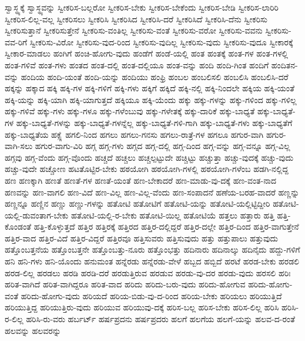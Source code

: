 {ಸ್ವಾಸ್ಥ್ಯಕ್ಕೆ
ಸ್ವಾಸ್ಥ್ಯವನ್ನು
ಸ್ವೀಕರಿಸ-ಬಲ್ಲರೋ
ಸ್ವೀಕರಿಸ-ಬೇಕು
ಸ್ವೀಕರಿಸ-ಬೇಕೆಂದು
ಸ್ವೀಕರಿಸ-ಬೇಡಿ
ಸ್ವೀಕರಿಸ-ಲಾರಿರಿ
ಸ್ವೀಕರಿಸ-ಲಿಲ್ಲ-ವಲ್ಲ
ಸ್ವೀಕರಿಸಲು
ಸ್ವೀಕರಿಸಿ
ಸ್ವೀಕರಿಸಿದ
ಸ್ವೀಕರಿಸಿ-ದರೆ
ಸ್ವೀಕರಿಸಿದೆ
ಸ್ವೀಕರಿಸಿ-ದೆನು
ಸ್ವೀಕರಿಸು
ಸ್ವೀಕರಿಸುತ್ತಾನೆ
ಸ್ವೀಕರಿಸುತ್ತೇನೆ
ಸ್ವೀಕರಿಸು-ವಂತಿಲ್ಲ
ಸ್ವೀಕರಿಸು-ವಂತೆ
ಸ್ವೀಕರಿಸು-ವರೋ
ಸ್ವೀಕರಿಸು-ವವನು
ಸ್ವೀಕರಿಸು-ವವ-ರಿಗೆ
ಸ್ವೀಕರಿಸು-ವಿರೋ
ಸ್ವೀಕರಿಸು-ವುದ-ರಿಂದ
ಸ್ವೀಕರಿಸು-ವುದಿಲ್ಲ
ಸ್ವೀಕರಿಸು-ವುದು
ಸ್ವೀಕರಿಸು-ವುದೂ
ಸ್ವೀಕಾರಕ್ಕೆ
ಸ್ವೀಕಾರ-ಮಾಡಲು
ಹಂಗಿಗೆ
ಹಂಚಿ-ಹೋಗು-ವುದು
ಹಂಡೆಗೆ
ಹಂಡೆ-ಯಲ್ಲಿ
ಹಂತ
ಹಂತಕ್ಕೆ
ಹಂತ-ಗಳ
ಹಂತ-ಗಳಲ್ಲಿ
ಹಂತ-ಗಳಿವೆ
ಹಂತ-ಗಳು
ಹಂತದ
ಹಂತ-ದಲ್ಲಿ
ಹಂತ-ದಲ್ಲಿಯೂ
ಹಂತ-ವನ್ನು
ಹಂದಿ
ಹಂದಿ-ಗಿಂತ
ಹಂದಿಗೆ
ಹಂದಿತನ-ವನ್ನು
ಹಂದಿಯ
ಹಂದಿ-ಯಂತೆ
ಹಂದಿ-ಯನ್ನು
ಹಂದಿಯು
ಹಂಫ್ರಿ
ಹಂಬಲ
ಹಂಬಲಿಸಲಿ
ಹಂಬಲಿಸಿ
ಹಂಬಲಿಸಿ-ದರೆ
ಹಕ್ಕನ್ನು
ಹಕ್ಕಾದ
ಹಕ್ಕಿ
ಹಕ್ಕಿ-ಗಳ
ಹಕ್ಕಿ-ಗಳಿಗೆ
ಹಕ್ಕಿ-ಗಳು
ಹಕ್ಕಿಗೆ
ಹಕ್ಕಿದೆ
ಹಕ್ಕಿ-ನಲ್ಲಿ
ಹಕ್ಕಿ-ನಿಂದಲೇ
ಹಕ್ಕಿಯ
ಹಕ್ಕಿ-ಯಂತೆ
ಹಕ್ಕಿ-ಯನ್ನು
ಹಕ್ಕಿ-ಯಾಗಿ
ಹಕ್ಕಿ-ಯಾಗುತ್ತದೆ
ಹಕ್ಕಿಯೂ
ಹಕ್ಕಿ-ಯೆಂದು
ಹಕ್ಕು
ಹಕ್ಕು-ಗಳನ್ನು
ಹಕ್ಕು-ಗಳಿಂದ
ಹಕ್ಕು-ಗಳಿಲ್ಲ
ಹಕ್ಕು-ಗಳಿವೆ
ಹಕ್ಕು-ಗಳು
ಹಕ್ಕು-ಗಳೂ
ಹಕ್ಕು-ಗಳೆಂಬುವು
ಹಕ್ಕು-ಗಳೇತಕ್ಕೆ
ಹಕ್ಕು-ದಾರಿಕೆ
ಹಕ್ಕು-ಬಾಧ್ಯತೆ
ಹಕ್ಕು-ಬಾಧ್ಯತೆ-ಗಳ
ಹಕ್ಕು-ಬಾಧ್ಯತೆ-ಗಳನ್ನು
ಹಕ್ಕು-ಬಾಧ್ಯತೆ-ಗಳನ್ನೆಲ್ಲ
ಹಕ್ಕು-ಬಾಧ್ಯತೆ-ಗಳಿ-ಗಾಗಿ
ಹಕ್ಕು-ಬಾಧ್ಯತೆ-ಗಳು
ಹಕ್ಕು-ಬಾಧ್ಯತೆಗೆ
ಹಕ್ಕು-ಬಾಧ್ಯತೆಯ
ಹಕ್ಸ್ಲೆ
ಹಗಲಿ-ನಿಂದ
ಹಗಲು
ಹಗಲು-ಗನಸು
ಹಗಲು-ರಾತ್ರೆ-ಗಳ
ಹಗಲೂ
ಹಗುರ-ವಾಗಿ
ಹಗುರ-ವಾಗಿ-ಸಲು
ಹಗುರ-ವಾಗು-ವಿರಿ
ಹಗ್ಗ
ಹಗ್ಗ-ಗಳು
ಹಗ್ಗದ
ಹಗ್ಗ-ದಲ್ಲಿ
ಹಗ್ಗ-ದಿಂದ
ಹಗ್ಗ-ವನ್ನು
ಹಗ್ಗ-ವನ್ನೂ
ಹಗ್ಗ-ವಿಲ್ಲ
ಹಗ್ಗವು
ಹಗ್ಗ-ವೆಂದು
ಹಗ್ಗ-ವೊಂದು
ಹಚ್ಚದೆ
ಹಚ್ಚಲು
ಹಚ್ಚಲ್ಪಟ್ಟುದೇ
ಹಚ್ಚಿಟ್ಟು
ಹಚ್ಚುತ್ತಾ
ಹಚ್ಚು-ವುದಕ್ಕೆ
ಹಚ್ಚು-ವುದು
ಹಚ್ಚು-ವುದೇ
ಹಚ್ಚೋಣ
ಹಟತೊಟ್ಟಿರ-ಬೇಕು
ಹಠಯೋಗಿ
ಹಠಯೋಗಿ-ಗಳಲ್ಲಿ
ಹಠಯೋಗಿ-ಗಳೆಂಬ
ಹಡಗಿ-ನಲ್ಲಿದ್ದ
ಹಣ
ಹಣಕ್ಕಾಗಿ
ಹಣತೆ
ಹಣತೆ-ಗಳ
ಹಣತೆ-ಯಂತೆ
ಹಣ-ಬೇಕಾದರೆ
ಹಣ-ಮಾಡು-ವು-ದಕ್ಕೆ
ಹಣ-ವಂತ-ನಾದ
ಹಣವನ್ನು
ಹಣ-ವಾಗಲಿ
ಹಣ-ವಿದೆ
ಹಣ-ವಿಲ್ಲ
ಹಣ-ವಿಲ್ಲ-ವೆಂದು
ಹಣ-ಸಂಪಾದನೆ
ಹಣೆಯ-ಬರಹ-ವಾದರೆ
ಹಣ್ಣನ್ನು
ಹಣ್ಣನ್ನೂ
ಹಣ್ಣಿನ
ಹಣ್ಣು
ಹಣ್ಣು-ಗಳನ್ನು
ಹತೋಟಿ
ಹತೋಟಿಗೆ
ಹತೋಟಿ-ಯನ್ನು
ಹತೋಟಿ-ಯಲ್ಲಿಟ್ಟಿದ್ದೀರಿ
ಹತೋಟಿ-ಯಲ್ಲಿ-ಡುವಂತಾಗ-ಬೇಕು
ಹತೋಟಿ-ಯಲ್ಲಿ-ರ-ಬೇಕು
ಹತೋಟಿ-ಯಿಲ್ಲ
ಹತೋಟಿಯೆ
ಹತ್ತಲು
ಹತ್ತಾರು
ಹತ್ತಿ
ಹತ್ತಿ-ಕೊಂಡಂತೆ
ಹತ್ತಿ-ಕೊಳ್ಳುತ್ತದೆ
ಹತ್ತಿರ
ಹತ್ತಿರಕ್ಕೆ
ಹತ್ತಿರದ
ಹತ್ತಿರ-ದಲ್ಲಿದ್ದರೆ
ಹತ್ತಿರ-ದಲ್ಲೇ
ಹತ್ತಿರ-ದಿಂದ
ಹತ್ತಿರ-ವಾಗುತ್ತೇನೆ
ಹತ್ತಿರ-ವಾದ
ಹತ್ತಿರ-ವಿದೆ
ಹತ್ತಿರ-ವಿದ್ದರೆ
ಹತ್ತಿರವೂ
ಹತ್ತಿಸುವರು
ಹತ್ತಿಸುವುದು
ಹತ್ತು
ಹತ್ತುಪಾಲು
ಹತ್ತುವುದು
ಹತ್ತೊಂಬತ್ತನೆಯ
ಹತ್ತೊಂಬತ್ತನೇ
ಹತ್ತೊಂಬತ್ತು-ನೂರು
ಹತ್ತೊಂಭತ್ತು
ಹದಿನಾರು
ಹದಿನಾಲ್ಕು
ಹದಿನೈದು
ಹದ್ದು-ಗಳಿಗೆ
ಹನಿ
ಹನಿ-ಗಳು
ಹನಿ-ಯೊಂದು
ಹನುಮಂತ
ಹನ್ನೆರಡು
ಹನ್ನೆರಡು-ವೇಳೆ
ಹಬ್ಬದ
ಹಬ್ಬಿದೆ
ಹರಟೆ
ಹರಡ-ಬೇಕು
ಹರಡಲಿ
ಹರಡ-ಲಿಲ್ಲ
ಹರಡಲು
ಹರಡಿ
ಹರಡಿ-ದರೆ
ಹರಡುತ್ತಿರುವ
ಹರಡುವ
ಹರಡು-ವು-ದರ
ಹರಡು-ವುದು
ಹರಸಲಿ
ಹರಿಃ
ಹರಿತ-ವಾಗಿದೆ
ಹರಿತ-ವಾಗಿದ್ದರೂ
ಹರಿತ-ವಾದ
ಹರಿದು
ಹರಿದು-ಬರು-ವುದು
ಹರಿದು-ಹೋಗುವ
ಹರಿದು-ಹೋಗು-ವಂತೆ
ಹರಿದು-ಹೋಗು-ವುದು
ಹರಿಯದೆ
ಹರಿಯ-ಬಿಡು-ವು-ದ-ರಿಂದ
ಹರಿಯ-ಬೇಕು
ಹರಿಯಲು
ಹರಿಯುತ್ತಿದೆ
ಹರಿಯುತ್ತಿದ್ದ
ಹರಿಯುತ್ತಿರು-ವುದು
ಹರಿಯುವ
ಹರಿಯುವು-ದಕ್ಕೆ
ಹರಿಸ-ಬಲ್ಲ
ಹರಿಸ-ಬೇಕು
ಹರಿಸ-ಲಿಲ್ಲ
ಹರಿಸಿ
ಹರಿಸಿ-ರ-ಲಿಲ್ಲ
ಹರಿಸಿ-ರು-ವರು
ಹರ್ಬರ್ಟ್
ಹರ್ಷಪ್ರದನು
ಹರ್ಷಪ್ರದರು
ಹಲಗೆ
ಹಲಗೆಯ
ಹಲಗೆ-ಯನ್ನು
ಹಲವ-ದ-ರಂತೆ
ಹಲವನ್ನು
ಹಲವರನ್ನು
}
